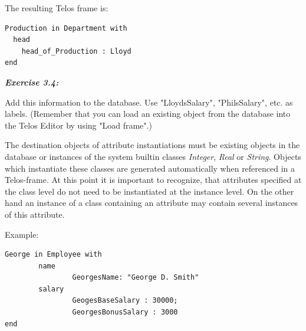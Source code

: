 \documentclass[10pt,a4paper]{article}
\begin{document}
The resulting Telos frame is:

\begin{verbatim}
Production in Department with
  head
    head_of_Production : Lloyd
end
\end{verbatim}


\vspace{0.7cm}
{\it
{\bf Exercise 3.4:}


  Add this information to the database.
  Use "LloydsSalary", "PhilsSalary", etc. as labels.
  (Remember that you can load an existing object from the database into
  the Telos Editor by using "Load frame".)
\\
}

The destination objects of attribute instantiations must be existing objects in
the database or instances of the system builtin classes {\em Integer},
{\em Real} or {\em String}. Objects which instantiate these classes are
generated automatically when referenced in a Telos-frame.
At this point it is important to recognize, that attributes specified at the
class level do not need to be instantiated at the instance level. On the other
hand an instance of a class containing an attribute may contain several
instances of this attribute.

Example:\\
\begin{verbatim}
George in Employee with
        name
                GeorgesName: "George D. Smith"
        salary
                GeogesBaseSalary : 30000;
                GeorgesBonusSalary : 3000
end
\end{verbatim}
\end{document}
